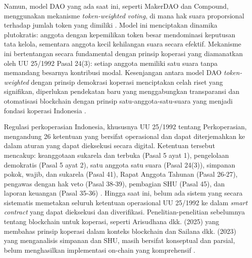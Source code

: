 \medskip
Namun, model DAO yang ada saat ini, seperti MakerDAO dan Compound, menggunakan mekanisme \textit{token-weighted voting}, di mana hak suara proporsional terhadap jumlah token yang dimiliki \cite{sun2022multiparty}. Model ini menciptakan dinamika plutokratis: anggota dengan kepemilikan token besar mendominasi keputusan tata kelola, sementara anggota kecil kehilangan suara secara efektif. Mekanisme ini bertentangan secara fundamental dengan prinsip koperasi yang diamanatkan oleh UU 25/1992 Pasal 24(3): setiap anggota memiliki satu suara tanpa memandang besarnya kontribusi modal. Kesenjangan antara model DAO \textit{token-weighted} dengan prinsip demokrasi koperasi menciptakan celah riset yang signifikan, diperlukan pendekatan baru yang menggabungkan transparansi dan otomatisasi blockchain dengan prinsip satu-anggota-satu-suara yang menjadi fondasi koperasi Indonesia \cite{sharma2024future}.

\medskip
Regulasi perkoperasian Indonesia, khususnya UU 25/1992 tentang Perkoperasian, mengandung 26 ketentuan yang bersifat operasional dan dapat diterjemahkan ke dalam aturan yang dapat dieksekusi secara digital. Ketentuan tersebut mencakup: keanggotaan sukarela dan terbuka (Pasal 5 ayat 1), pengelolaan demokratis (Pasal 5 ayat 2), satu anggota satu suara (Pasal 24(3)), simpanan pokok, wajib, dan sukarela (Pasal 41), Rapat Anggota Tahunan (Pasal 26-27), pengawas dengan hak veto (Pasal 38-39), pembagian SHU (Pasal 45), dan laporan keuangan (Pasal 35-36) \cite{maryam2025pendirian}. Hingga saat ini, belum ada sistem yang secara sistematis memetakan seluruh ketentuan operasional UU 25/1992 ke dalam \textit{smart contract} yang dapat dieksekusi dan diverifikasi. Penelitian-penelitian sebelumnya tentang blockchain untuk koperasi, seperti Arisudhana dkk. (2025) yang membahas prinsip koperasi dalam konteks blockchain dan Sailana dkk. (2023) yang menganalisis simpanan dan SHU, masih bersifat konseptual dan parsial, belum menghasilkan implementasi on-chain yang komprehensif \cite{arisudhana2025pelatihan}.

